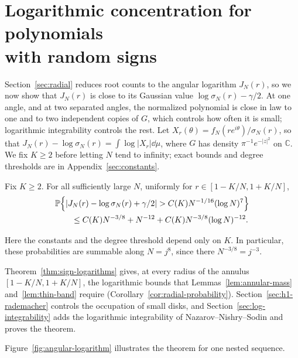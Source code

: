 \section[Logarithmic concentration for polynomials with random signs]{Logarithmic concentration for polynomials\\with random signs}
\label{sec:concentration}\label{sec:layer2}

Section~\ref{sec:radial} reduces root counts to the angular logarithm
$J_N(r)$, so we now show that $J_N(r)$ is close to its Gaussian value
$\log\sigma_N(r)-\gamma/2$. At one angle, and at two separated angles, the
normalized polynomial is close in law to one and to two independent copies
of $G$, which controls how often it is small; logarithmic integrability
controls the rest.
Let $X_r(\theta)=f_N(re^{i\theta})/\sigma_N(r)$, so that
$J_N(r)-\log\sigma_N(r)=\int\log|X_r|\dd\mu$, where $G$ has density
$\pi^{-1}e^{-|z|^2}$ on $\mathbb C$. We fix $K\ge2$ before letting $N$
tend to infinity; exact bounds and degree thresholds are in
Appendix~\ref{sec:constants}.

\begin{theorem}
\label{thm:sign-logarithms}
Fix $K\ge2$. For all sufficiently large $N$, uniformly for
$r\in[1-K/N,1+K/N]$,
\begin{align}
 &\mathbb P\!\left\{
 |J_N(r)-\log\sigma_N(r)+\gamma/2|
       >C(K)N^{-1/16}(\log N)^7\right\}\nonumber\\
 &\qquad\le C(K)N^{-3/8}+N^{-12}
                 +C(K)N^{-3/8}(\log N)^{-12}.
 \label{eq:sign-log-concentration}
\end{align}
\end{theorem}

Here the constants and the degree threshold depend only on $K$.
In particular, these probabilities are summable along $N=j^8$, since there
$N^{-3/8}=j^{-3}$.

Theorem~\ref{thm:sign-logarithms} gives, at every radius of the annulus
$[1-K/N,1+K/N]$, the logarithmic bounds that Lemmas~\ref{lem:annular-mass}
and~\ref{lem:thin-band} require (Corollary~\ref{cor:radial-probability}).
Section~\ref{sec:h1-rademacher} controls the occupation of small disks,
and Section~\ref{sec:log-integrability} adds the logarithmic integrability
of Nazarov--Nishry--Sodin and proves the theorem.

Figure~\ref{fig:angular-logarithm} illustrates the theorem for one nested sequence.



